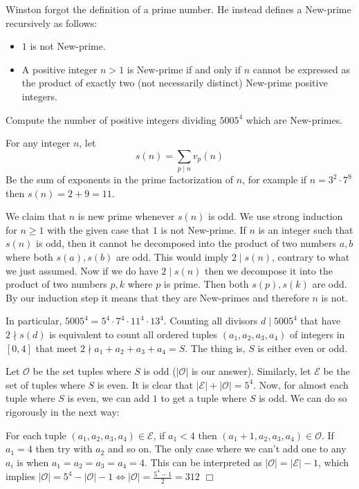 \newpageSol
\begin{problem}
    Winston forgot the definition of a prime number. He instead defines a New-prime recursively as follows:
\begin{itemize}
    \item \(1\) is not New-prime.
    \item A positive integer \( n > 1 \) is New-prime if and only if \( n \) cannot be expressed as the product of exactly two (not necessarily distinct) New-prime positive integers.
\end{itemize}
Compute the number of positive integers dividing \(5005^4\) which are New-primes.

\end{problem}

\begin{solution}[312]
    For any integer $n$, let 
    $$ s(n) = \sum _{p \mid n} v_p(n)$$
    Be the sum of exponents in the prime factorization of $n$, for example if $n=3^2 \cdot 7^9$ then $s(n) = 2 + 9 = 11$.
    
    We claim that $n$ is new prime whenever $s(n)$ is odd. We use strong induction for $n \geq 1$ with the given case that $1$ is not New-prime. If $n$ is an integer such that $s(n)$ is odd, then it cannot be decomposed into the product of two numbers $a,b$ where both $s(a), s(b)$ are odd. This would imply $2 \mid s(n)$, contrary to what we just assumed. Now if we do have $2 \mid s(n)$ then we decompose it into the product of two numbers $p,k$ where $p$ is prime. Then both $s(p), s(k)$ are odd. By our induction step it means that they are New-primes and therefore $n$ is not.

    In particular, $5005^4 = 5^4 \cdot 7^4 \cdot 11^4 \cdot 13^4$. Counting all divisors $d \mid 5005^4$ that have $2 \nmid s(d)$ is equivalent to count all ordered tuples $(a_1, a_2, a_3, a_4)$ of integers in $[0,4]$ that meet $2 \nmid a_1+a_2+a_3+a_4 = S$. The thing is, $S$ is either even or odd. 
    
    Let $\mathcal{O}$ be the set tuples where $S$ is odd ($|\mathcal{O}|$ is our answer). Similarly, let $\mathcal{E}$ be the set of tuples where $S$ is even. It is clear that $|\mathcal{E}| + |\mathcal{O}| = 5^4$. Now, for almost each tuple where $S$ is even, we can add $1$ to get a tuple where $S$ is odd. We can do so rigorously in the next way: 
    
    For each tuple $(a_1, a_2, a_3, a_4) \in \mathcal{E}$, if $a_1 < 4$ then $(a_1+1, a_2, a_3, a_4) \in \mathcal{O}$. If $a_1=4$ then try with $a_2$ and so on. The only case where we can't add one to any $a_i$ is when $a_1=a_2=a_3=a_4=4$. This can be interpreted as  $|\mathcal{O}| = |\mathcal{E}|-1$, which implies $|\mathcal{O}| = 5^4 - |\mathcal{O}| - 1 \iff |\mathcal{O}| = \frac{5^4-1}{2} = 312$ $\Box$ 
\end{solution}


